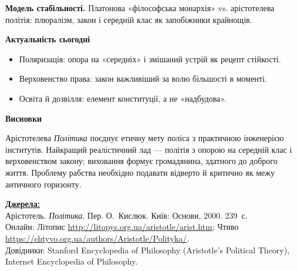 \documentclass[12pt,a4paper]{article}
\begin{document}
\textbf{Модель стабільності.} Платонова «філософська монархія» vs. арістотелева політія: плюралізм, закон і середній клас як запобіжники крайнощів.

\vspace{0.8em}
\begin{center}\textbf{\large Актуальність сьогодні}\end{center}

\begin{itemize}
    \item Поляризація: опора на «середніх» і змішаний устрій як рецепт стійкості.
    \item Верховенство права: закон важливіший за волю більшості в моменті.
    \item Освіта й дозвілля: елемент конституції, а не «надбудова».
\end{itemize}

\vspace{0.8em}
\begin{center}\textbf{\large Висновки}\end{center}

Арістотелева \textit{Політика} поєднує етичну мету поліса з практичною інженерією інститутів. Найкращий реалістичний лад — політія з опорою на середній клас і верховенством закону; виховання формує громадянина, здатного до доброго життя. Проблему рабства необхідно подавати відверто й критично як межу античного горизонту.

\vspace{1.0em}
\setlength{\parindent}{0pt}
\textbf{\underline{Джерела:}}\\[0.2em]
Арістотель. \textit{Політика}. Пер. О.~Кислюк. Київ: Основи, 2000. 239~с.\\
Онлайн: Літопис \url{http://litopys.org.ua/aristotle/arist.htm}; Чтиво \url{https://chtyvo.org.ua/authors/Aristotle/Polityka/}.\\
Довідники: Stanford Encyclopedia of Philosophy (Aristotle’s Political Theory), Internet Encyclopedia of Philosophy.
\end{document}
